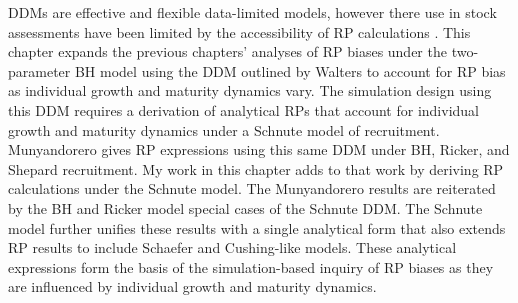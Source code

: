 DDMs are effective and flexible data-limited models, however there use in 
stock assessments have been limited by the accessibility of RP calculations 
\cite{munyandorero_analytical_2023}. %
%
This chapter expands the previous chapters' analyses of RP biases under the 
two-parameter BH model using the DDM outlined by Walters \cite{walters_continuous_2020}
to account for RP bias as individual growth and maturity dynamics vary.
%
The simulation design using this DDM requires a derivation 
of analytical RPs that account for individual growth and
maturity dynamics under a Schnute model of recruitment.
Munyandorero \cite{munyandorero_analytical_2023} gives RP expressions using 
this same DDM %
under BH, Ricker, and Shepard recruitment. 
My work in this chapter adds to that work by deriving RP calculations under 
the Schnute model. The Munyandorero results are reiterated by the BH and Ricker 
model special cases of the Schnute DDM. %
The Schnute model further unifies these results with a single analytical form that 
also extends RP results to include Schaefer and Cushing-like models. 
These analytical expressions form the basis of the simulation-based inquiry of 
RP biases as they are influenced by individual growth and maturity dynamics.

